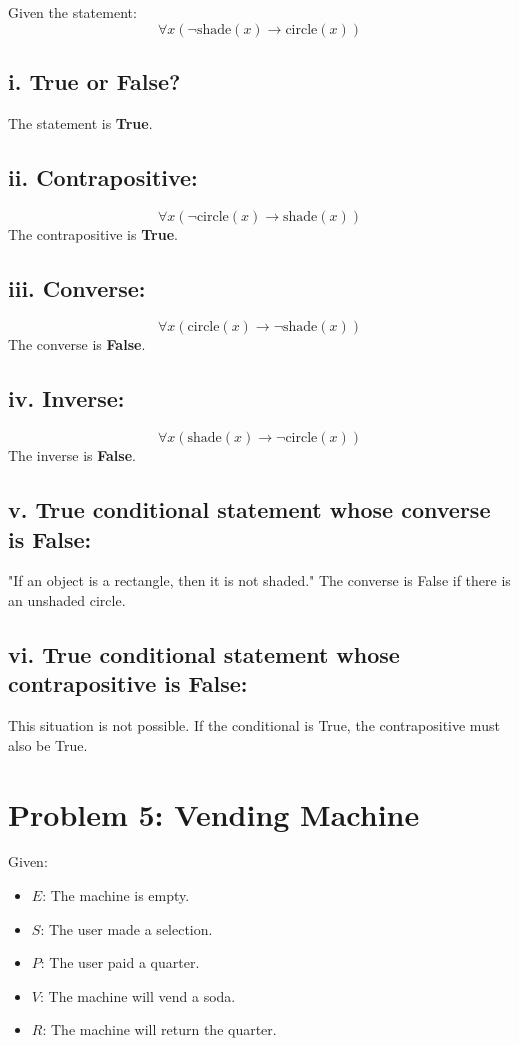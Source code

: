 \documentclass{article}
\begin{document}
Given the statement:
\[
\forall x (\neg \text{shade}(x) \rightarrow \text{circle}(x))
\]

\subsection*{i. True or False?}
The statement is \textbf{True}.

\subsection*{ii. Contrapositive:}
\[
\forall x (\neg \text{circle}(x) \rightarrow \text{shade}(x))
\]
The contrapositive is \textbf{True}.

\subsection*{iii. Converse:}
\[
\forall x (\text{circle}(x) \rightarrow \neg \text{shade}(x))
\]
The converse is \textbf{False}.

\subsection*{iv. Inverse:}
\[
\forall x (\text{shade}(x) \rightarrow \neg \text{circle}(x))
\]
The inverse is \textbf{False}.

\subsection*{v. True conditional statement whose converse is False:}
"If an object is a rectangle, then it is not shaded."
The converse is False if there is an unshaded circle.

\subsection*{vi. True conditional statement whose contrapositive is False:}
This situation is not possible. If the conditional is True, the contrapositive must also be True.
\newpage

\section*{Problem 5: Vending Machine}

Given:
\begin{itemize}
    \item $E$: The machine is empty.
    \item $S$: The user made a selection.
    \item $P$: The user paid a quarter.
    \item $V$: The machine will vend a soda.
    \item $R$: The machine will return the quarter.
\end{itemize}
\end{document}
